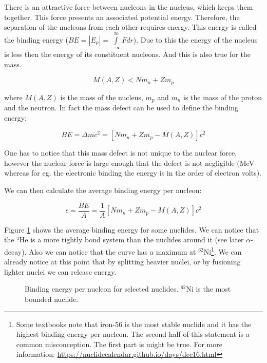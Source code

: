 There is an attractive force between nucleons in the nucleus, which keeps them together. This force presents an associated potential energy. Therefore, the separation of the nucleons from each other requires energy. This energy is called the binding energy ($BE=|E_p|=\int\limits_{-\infty}^\infty Fdr$). Due to this the energy of the nucleus is less then the energy of its constituent nucleons. And this is also true for the mass. 

\[
M(A,Z)<Nm_n+Zm_p
\]

\noindent where $M(A,Z)$ is the mass of the nucleus, $m_p$ and $m_n$ is the mass of the proton and the neutron. In fact the mass defect can be used to define the binding energy:

\[
BE=\Delta mc^2=[Nm_n+Zm_p-M(A,Z)]c^2
\]

One has to notice that this mass defect is not unique to the nuclear force, however the nuclear force is large enough that the defect is not negligible (MeV whereas for eg. the electronic binding the energy is in the order of electron volts).

We can then calculate the average binding energy per nucleon:

\[
\epsilon=\frac{BE}{A}=\frac{1}{A}[Nm_n+Zm_p-M(A,Z)]c^2
\]

Figure \ref{fig:binding} shows the average binding energy for some nuclides. We can notice that the ${}^4$He is a more tightly bond system than the nuclides around it (see later $\alpha$-decay). Also we can notice that the curve has a maximum at ${}^{62}$Ni\footnote{Some textbooks note that iron-56 is the most stable nuclide and it has the highest binding energy per nucleon. The second half of this statement is a common misconception. The first part is might be true. For more information: \url{https://nuclidecalendar.github.io/days/dec16.html}}. We can already notice at this point that by splitting heavier nuclei, or by fusioning lighter nuclei we can release energy.


\begin{figure}[ht!]
\protect {}\protect
\caption{\label{fig:binding} \footnotesize{Binding energy per nucleon for selected nuclides. ${}^{62}\text{Ni}$ is the most bounded nuclide.}}
\end{figure}


